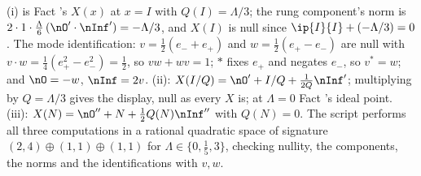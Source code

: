 (i) is Fact 's $X(x)$ at $x = I$ with $Q(I) = \Lambda/3$; the rung component's norm is $2 \cdot 1 \cdot \tfrac{\Lambda}{6}\,(\nO' \cdot \nInf') = -\Lambda/3$, and $X(I)$ is null since $\ip{I}{I} + (-\Lambda/3) = 0$. The mode identification: $v = \tfrac12(e_{-} + e_{+})$ and $w = \tfrac12(e_{+} - e_{-})$ are null with $v \cdot w = \tfrac14(e_{+}^{2} - e_{-}^{2}) = \tfrac12$, so $vw + wv = 1$; $*$ fixes $e_{+}$ and negates $e_{-}$, so $v^{*} = w$; and $\nO = -w$, $\nInf = 2v$. (ii): $X(I/Q) = \nO' + I/Q + \tfrac{1}{2Q}\nInf'$; multiplying by $Q = \Lambda/3$ gives the display, null as every $X$ is; at $\Lambda = 0$ Fact 's ideal point. (iii): $X(N) = \nO'' + N + \tfrac12 Q(N)\nInf''$ with $Q(N) = 0$. The script performs all three computations in a rational quadratic space of signature $(2,4) \oplus (1,1) \oplus (1,1)$ for $\Lambda \in \{0, \tfrac15, 3\}$, checking nullity, the components, the norms and the identifications with $v, w$.
